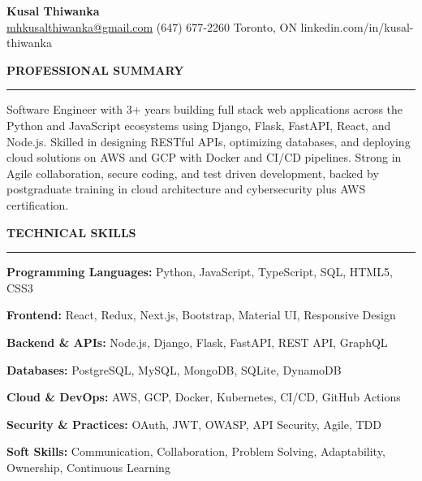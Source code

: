 \documentclass[10pt,letterpaper]{article}
\begin{document}
\begin{center}
{\LARGE\textbf{Kusal Thiwanka}}\\[3pt]
\href{mailto:mhkusalthiwanka@gmail.com}{mhkusalthiwanka@gmail.com}\hspace{2em}%
(647) 677{-}2260\hspace{2em}%
Toronto, ON\hspace{2em}
linkedin.com/in/kusal-thiwanka
\end{center}

\vspace{6pt}

\textbf{PROFESSIONAL SUMMARY}\\[-8pt]
\noindent\rule{\textwidth}{1pt}

\vspace{-2pt}

Software Engineer with 3+ years building full stack web applications across the Python and JavaScript ecosystems using Django, Flask, FastAPI, React, and Node.js. Skilled in designing RESTful APIs, optimizing databases, and deploying cloud solutions on AWS and GCP with Docker and CI/CD pipelines. Strong in Agile collaboration, secure coding, and test driven development, backed by postgraduate training in cloud architecture and cybersecurity plus AWS certification.

\vspace{8pt}

\textbf{TECHNICAL SKILLS}\\[-8pt]
\noindent\rule{\textwidth}{1pt}

\vspace{-2pt}

\textbf{Programming Languages:} Python, JavaScript, TypeScript, SQL, HTML5, CSS3

\textbf{Frontend:} React, Redux, Next.js, Bootstrap, Material UI, Responsive Design

\textbf{Backend \& APIs:} Node.js, Django, Flask, FastAPI, REST API, GraphQL

\textbf{Databases:} PostgreSQL, MySQL, MongoDB, SQLite, DynamoDB

\textbf{Cloud \& DevOps:} AWS, GCP, Docker, Kubernetes, CI/CD, GitHub Actions

\textbf{Security \& Practices:} OAuth, JWT, OWASP, API Security, Agile, TDD

\textbf{Soft Skills:} Communication, Collaboration, Problem Solving, Adaptability, Ownership, Continuous Learning

\vspace{8pt}
\end{document}
